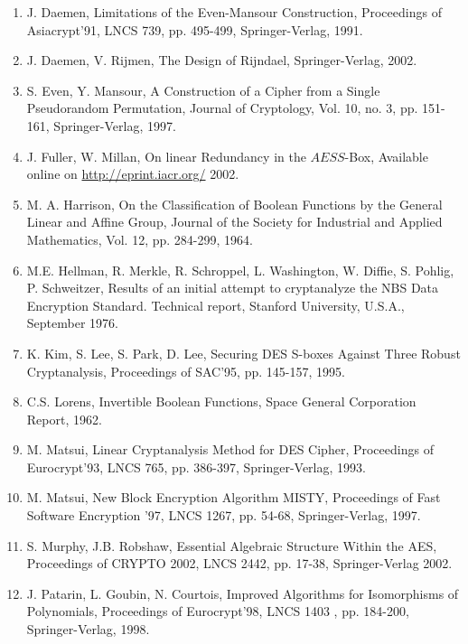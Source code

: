 \documentclass[10pt]{article}
\begin{document}
\begin{enumerate}
  \item J. Daemen, Limitations of the Even-Mansour Construction, Proceedings of Asiacrypt'91, LNCS 739, pp. 495-499, Springer-Verlag, 1991.
  \item J. Daemen, V. Rijmen, The Design of Rijndael, Springer-Verlag, 2002.
  \item S. Even, Y. Mansour, A Construction of a Cipher from a Single Pseudorandom Permutation, Journal of Cryptology, Vol. 10, no. 3, pp. 151-161, Springer-Verlag, 1997.
  \item J. Fuller, W. Millan, On linear Redundancy in the $A E S S$-Box, Available online on \href{http://eprint.iacr.org/}{http://eprint.iacr.org/} 2002.
  \item M. A. Harrison, On the Classification of Boolean Functions by the General Linear and Affine Group, Journal of the Society for Industrial and Applied Mathematics, Vol. 12, pp. 284-299, 1964.
  \item M.E. Hellman, R. Merkle, R. Schroppel, L. Washington, W. Diffie, S. Pohlig, P. Schweitzer, Results of an initial attempt to cryptanalyze the NBS Data Encryption Standard. Technical report, Stanford University, U.S.A., September 1976.
  \item K. Kim, S. Lee, S. Park, D. Lee, Securing DES S-boxes Against Three Robust Cryptanalysis, Proceedings of SAC'95, pp. 145-157, 1995.
  \item C.S. Lorens, Invertible Boolean Functions, Space General Corporation Report, 1962.
  \item M. Matsui, Linear Cryptanalysis Method for DES Cipher, Proceedings of Eurocrypt'93, LNCS 765, pp. 386-397, Springer-Verlag, 1993.
  \item M. Matsui, New Block Encryption Algorithm MISTY, Proceedings of Fast Software Encryption '97, LNCS 1267, pp. 54-68, Springer-Verlag, 1997.
  \item S. Murphy, J.B. Robshaw, Essential Algebraic Structure Within the AES, Proceedings of CRYPTO 2002, LNCS 2442, pp. 17-38, Springer-Verlag 2002.
  \item J. Patarin, L. Goubin, N. Courtois, Improved Algorithms for Isomorphisms of Polynomials, Proceedings of Eurocrypt'98, LNCS 1403 , pp. 184-200, Springer-Verlag, 1998.
\end{enumerate}
\end{document}
